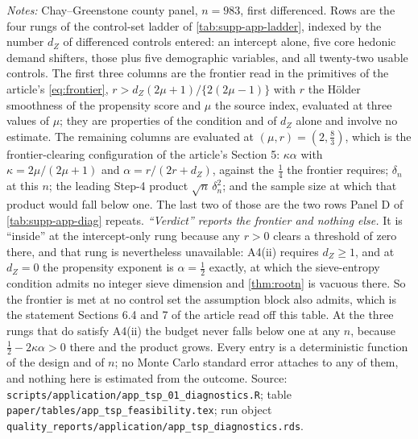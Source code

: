 \documentclass[
  12pt]{article}
\newcommand{\1}[1]{\mathds{1}\left[#1\right]}
\theoremstyle{plain}
\theoremstyle{definition}
\theoremstyle{definition}
\theoremstyle{remark}
\begin{document}
\begin{table}[!htbp]
\centering
\begin{threeparttable}
\caption{The frontier at each rung of the control-set ladder}
\label{tab:supp-app-feasibility}
\footnotesize

\begin{tablenotes}\footnotesize
\item \textit{Notes:} Chay--Greenstone county panel, $n=983$, first differenced.
Rows are the four rungs of the control-set ladder of
\cref{tab:supp-app-ladder}, indexed by the number $d_Z$ of differenced controls
entered: an intercept alone, five core hedonic demand shifters, those plus five
demographic variables, and all twenty-two usable controls. The first three
columns are the frontier read in the primitives of the article's
\eqref{eq:frontier}, $r>d_Z(2\mu+1)/\{2(2\mu-1)\}$ with $r$ the H\"older
smoothness of the propensity score and $\mu$ the source index, evaluated at
three values of $\mu$; they are properties of the condition and of $d_Z$ alone
and involve no estimate. The remaining columns are evaluated at
$(\mu,r)=(2,\tfrac83)$, which is the frontier-clearing configuration of the
article's Section 5: $\kappa\alpha$ with $\kappa=2\mu/(2\mu+1)$ and
$\alpha=r/(2r+d_Z)$, against the $\tfrac14$ the frontier requires; $\delta_n$ at
this $n$; the leading Step-4 product $\sqrt n\,\delta_n^{2}$; and the sample
size at which that product would fall below one. The last two of those are the
two rows Panel D of \cref{tab:supp-app-diag} repeats. \emph{``Verdict'' reports
the frontier and nothing else.} It is ``inside'' at the intercept-only rung
because any $r>0$ clears a threshold of zero there, and that rung is
nevertheless unavailable: A4(ii) requires $d_Z\ge1$, and at $d_Z=0$ the
propensity exponent is $\alpha=\tfrac12$ exactly, at which the sieve-entropy
condition admits no integer sieve dimension and \cref{thm:rootn} is vacuous
there. So the frontier is met at no control set the assumption block also
admits, which is the statement Sections 6.4 and 7 of the article read off this
table. At the three rungs that do satisfy A4(ii) the budget never falls below
one at any $n$, because $\tfrac12-2\kappa\alpha>0$ there and the product grows.
Every entry is a deterministic function of the design and of $n$; no Monte Carlo
standard error attaches to any of them, and nothing here is estimated from the
outcome. Source: \texttt{scripts/application/app\_tsp\_01\_diagnostics.R}; table
\texttt{paper/tables/app\_tsp\_feasibility.tex}; run object
\texttt{quality\_reports/application/app\_tsp\_diagnostics.rds}.
\end{tablenotes}
\end{threeparttable}
\end{table}
\end{document}
